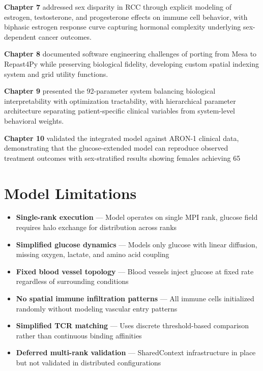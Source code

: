 \textbf{Chapter 7} addressed sex disparity in RCC through explicit modeling of estrogen, testosterone, and progesterone effects on immune cell behavior, with biphasic estrogen response curve capturing hormonal complexity underlying sex-dependent cancer outcomes.

\textbf{Chapter 8} documented software engineering challenges of porting from Mesa to Repast4Py while preserving biological fidelity, developing custom spatial indexing system and grid utility functions.

\textbf{Chapter 9} presented the 92-parameter system balancing biological interpretability with optimization tractability, with hierarchical parameter architecture separating patient-specific clinical variables from system-level behavioral weights.

\textbf{Chapter 10} validated the integrated model against ARON-1 clinical data, demonstrating that the glucose-extended model can reproduce observed treatment outcomes with sex-stratified results showing females achieving 65%

\section{Model Limitations}
\label{sec:limitations}

\begin{itemize}
    \item \textbf{Single-rank execution} — Model operates on single MPI rank, glucose field requires halo exchange for distribution across ranks
    \item \textbf{Simplified glucose dynamics} — Models only glucose with linear diffusion, missing oxygen, lactate, and amino acid coupling
    \item \textbf{Fixed blood vessel topology} — Blood vessels inject glucose at fixed rate regardless of surrounding conditions
    \item \textbf{No spatial immune infiltration patterns} — All immune cells initialized randomly without modeling vascular entry patterns  
    \item \textbf{Simplified TCR matching} — Uses discrete threshold-based comparison rather than continuous binding affinities
    \item \textbf{Deferred multi-rank validation} — SharedContext infrastructure in place but not validated in distributed configurations
\end{itemize}

